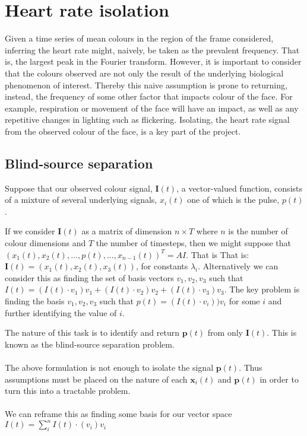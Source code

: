 \section{Heart rate isolation}
Given a time series of mean colours in the region of the frame considered, inferring the heart rate might, naively, be taken as the prevalent frequency. That is, the largest peak in the Fourier transform. However, it is important to consider that the colours observed are not only the result of the underlying biological phenomenon of interest. Thereby this naive assumption is prone to returning, instead, the frequency of some other factor that impacts colour of the face. For example, respiration or movement of the face will have an impact, as well as any repetitive changes in lighting such as flickering. Isolating, the heart rate signal from the observed colour of the face, is a key part of the project.

\subsection{Blind-source separation}
Suppose that our observed colour signal, $\mathbf{I}(t)$, a vector-valued function, consists of a mixture of several underlying signals, $x_i(t)$ one of which is the pulse, $p(t)$. 

If we consider $\mathbf{I}(t)$ as a matrix of dimension $n \times T$ where $n$ is the number of colour dimensions and $T$ the number of timesteps, then we might suppose that $ (x_1(t), x_2(t), ..., p(t), ..., x_{n-1}(t))^T = AI$. That is 
That is: $\mathbf{I}(t) = (x_1(t), x_2(t), x_3(t))$, for constants $\lambda_i$. 
Alternatively we can consider this as finding the set of basis vectors $v_1, v_2, v_3$ such that $I(t) = (I(t)\cdot v_1)v_1 + (I(t) \cdot v_2)v_2 + (I(t) \cdot v_3)v_3$. The key problem is finding the basis $v_1, v_2, v_3$ such that $p(t) = (I(t)\cdot v_i))v_i$ for some $i$ and further identifying the value of $i$.

The nature of this task is to identify and return $\mathbf{p}(t)$ from only $\mathbf{I}(t)$. This is known as the blind-source separation problem. 
\\ \\
The above formulation is not enough to isolate the signal $\mathbf{p}(t)$. Thus assumptions must be placed on the nature of each $\mathbf{x}_i(t)$ and $\mathbf{p}(t)$ in order to turn this into a tractable problem. 
\\ \\ 
We can reframe this as finding some basis for our vector space $I(t) = \sum_{i}^{n}I(t)\cdot(v_i)v_i$


